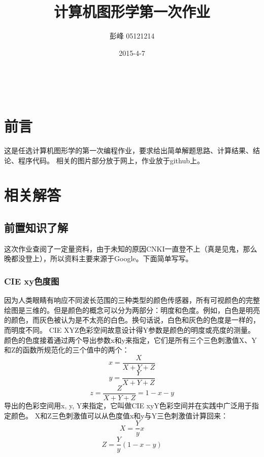 \documentclass[UTF8]{article}
\begin{document}
\author{彭峰  05121214}
\date{2015-4-7}
\title{ 计算机图形学第一次作业  } 
\titlelabel{\S\thetitle\quad}

\tableofcontents
~
~
\maketitle
\section{前言}
这是任选计算机图形学的第一次编程作业，要求给出简单解题思路、计算结果、结论、程序代码。
相关的图片部分放于网上，作业放于github上。
\section{相关解答}
\subsection{前置知识了解}
这次作业查阅了一定量资料，由于未知的原因CNKI一直登不上（真是见鬼，那么晚都没登上），所以资料主要来源于Google。下面简单写写。
\subsubsection{CIE xy色度图}
因为人类眼睛有响应不同波长范围的三种类型的颜色传感器，所有可视颜色的完整绘图是三维的。但是颜色的概念可以分为两部分：明度和色度。例如，白色是明亮的颜色，而灰色被认为是不太亮的白色。换句话说，白色和灰色的色度是一样的，而明度不同。
CIE XYZ色彩空间故意设计得Y参数是颜色的明度或亮度的测量。颜色的色度接着通过两个导出参数x和y来指定，它们是所有三个三色刺激值X、Y和Z的函数所规范化的三个值中的两个：
\begin{equation} \label{eq:solve}
x = \frac{X}{X+Y+Z}
\end{equation}
\begin{equation}
y = \frac{Y}{X+Y+Z}
\end{equation}
\begin{equation}
z = \frac{Z}{X+Y+Z} = 1 - x - y
\end{equation}
导出的色彩空间用x, y, Y来指定，它叫做CIE xyY色彩空间并在实践中广泛用于指定颜色。
X和Z三色刺激值可以从色度值x和y与Y三色刺激值计算回来：
\begin{equation}
X=\frac{Y}{y}x
\end{equation}
\begin{equation}
Z=\frac{Y}{y}(1-x-y)
\end{equation}
\end{document}
